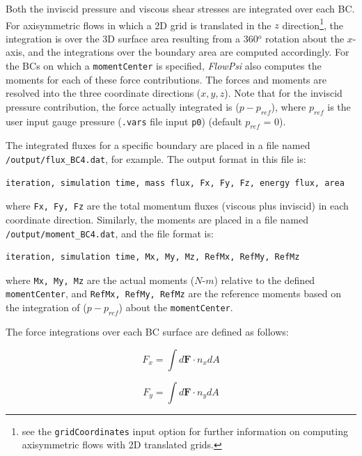 \documentclass{article}
\begin{document}
Both the inviscid pressure and viscous shear stresses are integrated
over each BC.  For axisymmetric flows in which a 2D grid is translated
in the $z$ direction\footnote{see the {\tt gridCoordinates} input
  option for further information on computing axisymmetric flows with
  2D translated grids.}, the integration is over the 3D surface area
resulting from a 360$^o$ rotation about the $x$-axis, and the
integrations over the boundary area are computed accordingly.  For the
BCs on which a \verb!momentCenter! is specified, {\em FlowPsi} also
computes the moments for each of these force contributions.  The
forces and moments are resolved into the three coordinate directions
($x,y,z$).  Note that for the inviscid pressure contribution, the
force actually integrated is ({\it{$p - p_{ref}$}}), where $p_{ref}$
is the user input gauge pressure ({\tt .vars} file input {\tt p0})
(default $p_{ref}$ = 0).

The integrated fluxes for a specific boundary are placed in a file named \verb!/output/flux_BC4.dat!, for example.  The output format in this file is:
\begin{verbatim}
iteration, simulation time, mass flux, Fx, Fy, Fz, energy flux, area
\end{verbatim}
where \verb!Fx, Fy, Fz! are the total momentum fluxes (viscous plus inviscid) in each coordinate direction.  Similarly, the moments are placed in a file named \verb!/output/moment_BC4.dat!, and the file format is:
\begin{verbatim}
iteration, simulation time, Mx, My, Mz, RefMx, RefMy, RefMz
\end{verbatim}
where \verb!Mx, My, Mz! are the actual moments ($N$-$m$) relative to the defined \verb!momentCenter!, and \verb!RefMx, RefMy, RefMz! are the reference moments based on the integration of ({\it{$p - p_{ref}$}}) about the \verb!momentCenter!.

The force integrations over each BC surface are defined as follows:

\begin{equation}
F_x = \int{d\textbf{F} \cdot n_x dA}
\end{equation}

\begin{equation}
F_y = \int{d\textbf{F} \cdot n_y dA}
\end{equation}
\end{document}
